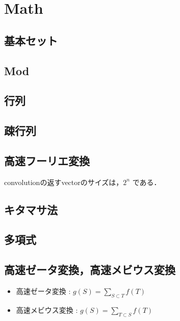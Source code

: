 \section{Math}

\subsection{基本セット}


\subsection{Mod}


\subsection{行列}



\subsection{疎行列}



\subsection{高速フーリエ変換}
convolutionの返すvectorのサイズは，$2^n$ である．


\subsection{キタマサ法}


\subsection{多項式}


\subsection{高速ゼータ変換，高速メビウス変換}
\begin{itemize}
  \item 高速ゼータ変換 : $g(S) = \displaystyle\sum_{S \subset T} f(T)$
  \item 高速メビウス変換 : $g(S) = \displaystyle\sum_{T \subset S} f(T)$
\end{itemize}

